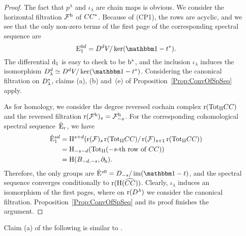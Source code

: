 \documentclass[\MainFolder/Text.tex]{subfiles}
\begin{document}
\begin{proof}
The fact that $p^\lambda$ and $\iota_\lambda$ are chain maps is obvious. We consider the horizontal filtration $\mathcal{F}^{\mathrm{h}}$ of $CC^*$. Because of (CP1), the rows are acyclic, and we see that the only non-zero terms of the first page of the corresponding spectral sequence are 
$$ \SSPage_1^{0 d} =  \HC^d V / \ker(\Id - \CycPermOp^*). $$ The differential $\mathrm{d}_1$ is easy to check to be $\mathrm{b}^*$, and the inclusion $\iota_\lambda$ induces the isomorphism $\HC_{\lambda}^d\simeq \HC^d V / \ker(\Id - \CycPermOp^*)$. Considering the canonical filtration on $D^*_\lambda$, claims (a), (b) and~(e) of Proposition~\ref{Prop:ConvOfSpSeq} apply.

As for homology, we consider the degree reversed cochain complex $\operatorname{r}({\mathrm{Tot}_{\mathrm{II}}} CC)$ and the reversed filtration $\operatorname{r}(\mathcal{F}^{\mathrm{h}})_s = \mathcal{F}^{\mathrm{h}}_{-s}$. For the corresponding cohomological spectral sequence~$\tilde{\mathrm{E}}_r$, we have
\begin{align*}
\tilde{\mathrm{E}}_1^{sd} &= \mathrm{H}^{s+d}(\operatorname{r}(\mathcal{F})_{s}\operatorname{r}({\mathrm{Tot}_{\mathrm{II}}} CC)/\operatorname{r}(\mathcal{F})_{s+1}\operatorname{r}({\mathrm{Tot}_{\mathrm{II}}}CC)) \\
&=\mathrm{H}_{-s-d}({\mathrm{Tot}_{\mathrm{II}}}(-s\text{-th row of }CC)) \\
&=\mathrm{H}(B_{-d,-s},\partial_{\mathrm{h}}).
\end{align*}
Therefore, the only groups are $\tilde{\SSPage}^{s0} = \HC_{-s}/\im(\Id-\CycPermOp)$, and the spectral sequence converges conditionally to $\operatorname{r}(\mathrm{H}(\widehat{CC}))$. Clearly, $\iota_\lambda$ induces an isomorphism of the first pages, where on $\operatorname{r}(D^\lambda)$ we consider the canonical filtration. Proposition~\ref{Prop:ConvOfSpSeq} and its proof finishes the argument.
\end{proof}

Claim (a) of the following is similar to \cite[Lemma 2.12]{Cieliebak2018b}.
\end{document}
